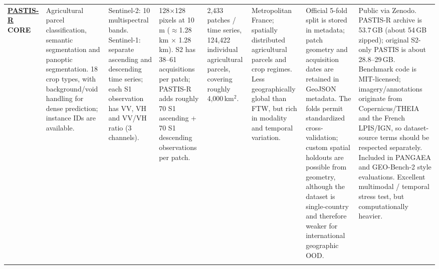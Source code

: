 \documentclass[11pt,a4paper]{article}
\begin{document}
\begin{landscape}
\begin{longtable}{
    Q{1.8cm}
    Q{2.5cm}
    Q{3.0cm}
    Q{2.5cm}
    Q{2.1cm}
    Q{3.0cm}
    Q{3.4cm}
    Q{3.4cm}
}
\href{https://github.com/VSainteuf/pastis-benchmark}{\textbf{PASTIS-R}}\newline
\textbf{CORE}
&
Agricultural parcel classification, semantic segmentation and panoptic segmentation. 18 crop types, with background/void handling for dense prediction; instance IDs are available.
&
Sentinel-2: 10 multispectral bands. Sentinel-1: separate ascending and descending time series; each S1 observation has VV, VH and VV/VH ratio (3 channels).
&
128$\times$128 pixels at 10\,m ($\approx$1.28\,km $\times$ 1.28\,km). S2 has 38--61 acquisitions per patch; PASTIS-R adds roughly 70 S1 ascending + 70 S1 descending observations per patch.
&
2,433 patches / time series, 124,422 individual agricultural parcels, covering roughly 4,000\,km$^2$.
&
Metropolitan France; spatially distributed agricultural parcels and crop regimes. Less geographically global than FTW, but rich in modality and temporal variation.
&
Official 5-fold split is stored in metadata; patch geometry and acquisition dates are retained in GeoJSON metadata. The folds permit standardized cross-validation; custom spatial holdouts are possible from geometry, although the dataset is single-country and therefore weaker for international geographic OOD.
&
Public via Zenodo. PASTIS-R archive is 53.7\,GB (about 54\,GB zipped); original S2-only PASTIS is about 28.8--29\,GB. Benchmark code is MIT-licensed; imagery/annotations originate from Copernicus/THEIA and the French LPIS/IGN, so dataset-source terms should be respected separately. Included in PANGAEA and GEO-Bench-2 style evaluations. Excellent multimodal / temporal stress test, but computationally heavier.
\\
\addlinespace


\end{longtable}
\end{landscape}
\end{document}
